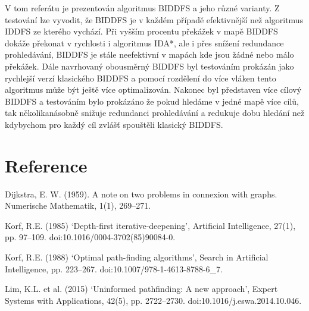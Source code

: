 \documentclass[12pt]{report}
\begin{document}
	V tom referátu je prezentován algoritmus BIDDFS a jeho různé varianty. Z testování lze vyvodit, že BIDDFS je v každém případě efektivnější než algoritmus IDDFS ze kterého vychází. Při vyšším procentu překážek v mapě BIDDFS dokáže překonat v rychlosti i algoritmus IDA*, ale i přes snížení redundance prohledávání, BIDDFS je stále neefektivní v mapách kde jsou žádné nebo málo překážek. Dále navrhovaný obousměrný BIDDFS byl testováním prokázán jako rychlejší verzí klasického BIDDFS a pomocí rozdělení do více vláken tento algoritmus může být ještě více optimalizován. Nakonec byl představen více cílový BIDDFS a testováním bylo prokázáno že pokud hledáme v jedné mapě více cílů, tak několikanásobně snižuje redundanci prohledávání a redukuje dobu hledání než kdybychom pro každý cíl zvlášť spouštěli klasický BIDDFS.
	
	
	\section*{Reference}
	
	Dijkstra, E. W. (1959). A note on two problems in connexion with graphs.
	Numerische Mathematik, 1(1), 269–271.
	
	Korf, R.E. (1985) ‘Depth-first iterative-deepening’, Artificial Intelligence, 27(1), pp. 97–109. doi:10.1016/0004-3702(85)90084-0.
	
	Korf, R.E. (1988) ‘Optimal path-finding algorithms’, Search in Artificial Intelligence, pp. 223–267. doi:10.1007/978-1-4613-8788-6\_7. 
	
	Lim, K.L. et al. (2015) ‘Uninformed pathfinding: A new approach’, Expert Systems with Applications, 42(5), pp. 2722–2730. doi:10.1016/j.eswa.2014.10.046.
	
	
	
\end{document}
